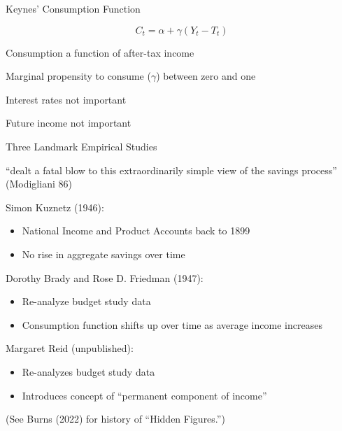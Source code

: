 \documentclass[11pt, aspectratio=169]{beamer}
\newenvironment{witemize}{\itemize\addtolength{\itemsep}{10pt}}{\enditemize}
\begin{document}
\begin{frame}{Keynes' Consumption Function}

\begin{equation*}
	C_t = \alpha + \gamma (Y_t - T_t) 
\end{equation*}

\begin{witemize}
	\item Consumption a function of after-tax income
	\item Marginal propensity to consume ($\gamma$) between zero and one
	\item Interest rates not important
	\item Future income not important
\end{witemize}
\end{frame}


\begin{frame}{Three Landmark Empirical Studies}

``dealt a fatal blow to this extraordinarily simple view of the savings process'' {\small (Modigliani 86)}

\vspace{10pt}
\begin{witemize}
	\item Simon Kuznetz (1946):
	\begin{itemize}
		\item National Income and Product Accounts back to 1899
		\item No rise in aggregate savings over time
	\end{itemize}
	\item Dorothy Brady and Rose D. Friedman (1947):
	\begin{itemize}
		\item Re-analyze budget study data 
		\item Consumption function shifts up over time as average income increases
	\end{itemize}
	\item Margaret Reid (unpublished):
	\begin{itemize}
		\item Re-analyzes budget study data
		\item Introduces concept of ``permanent component of income'' 
	\end{itemize}
\end{witemize}

\vspace{5pt}
{\small (See Burns (2022) for history of ``Hidden Figures.'')}

\end{frame}
\end{document}
